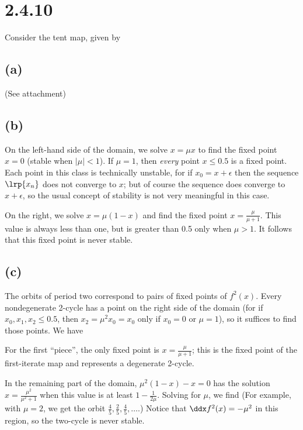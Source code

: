 \documentclass{article}
\begin{document}
\section{2.4.10}
Consider the tent map, given by
\subsection*{(a)} (See attachment)
\subsection*{(b)}
On the left-hand side of the domain, we solve $x=\mu x$ to find the fixed point $x=0$ (stable when $|\mu|<1$). If $\mu=1$, then \emph{every} point $x\leq0.5$ is a fixed point. Each point in this class is technically unstable, for if $x_0=x+\epsilon$ then the sequence $\lrp{x_n}$ does not converge to $x$; but of course the sequence does converge to $x+\epsilon$, so the usual concept of stability is not very meaningful in this case.

On the right, we solve $x=\mu(1-x)$ and find the fixed point $x=\frac{\mu}{\mu+1}$. This value is always less than one, but is greater than 0.5 only when $\mu>1$. It follows that this fixed point is never stable.

\subsection*{(c)}
The orbits of period two correspond to pairs of fixed points of $f^2(x)$. Every nondegenerate 2-cycle has a point on the right side of the domain (for if $x_0,x_1,x_2\leq0.5$, then $x_2=\mu^2x_0=x_0$ only if $x_0=0$ or $\mu=1$), so it suffices to find those points. We have

For the first ``piece'', the only fixed point is $x=\frac{\mu}{\mu+1}$; this is the fixed point of the first-iterate map and represents a degenerate 2-cycle.

In the remaining part of the domain, $\mu^2(1-x)-x=0$ has the solution $x=\frac{\mu^2}{\mu^2+1}$ when this value is at least $1-\frac{1}{2\mu}$. Solving for $\mu$, we find
(For example, with $\mu=2$, we get the orbit $\frac{4}{5},\frac{2}{5},\frac{4}{5},\ldots$.) Notice that $\ddx f^2(x)=-\mu^2$ in this region, so the two-cycle is never stable.
\end{document}
